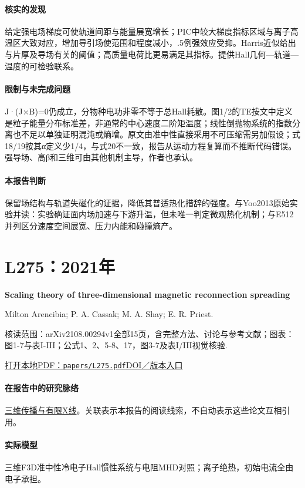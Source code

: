 \paragraph{核实的发现}给定强电场梯度可使轨道间距与能量展宽增长；PIC中较大梯度指标区域与离子高温区大致对应，增加导引场使范围和程度减小，.5例强效应受抑。Harris近似给出与片厚及导场有关的阈值；高质量电荷比更易满足其指标。提供Hall几何—轨道—温度的可检验联系。

\paragraph{限制与未完成问题}J·(J×B)=0仍成立，分物种电功非零不等于总Hall耗散。图1/2的TE按文中定义是粒子能量分布标准差，非通常的中心速度二阶矩温度；线性倒抛物系统的指数分离也不足以单独证明混沌或熵增。原文由准中性直接采用不可压缩需另加假设；式18/19按其α定义少1/4，与式20不一致，报告从运动方程复算而不推断代码错误。强导场、高β和三维可由其他机制主导，作者也承认。

\paragraph{本报告判断}保留场结构与轨道失磁化的证据，降低其普适热化措辞的强度。与Yoo2013原始实验并读：实验确证面内场加速与下游升温，但未唯一判定微观热化机制；与E512并列区分速度空间展宽、压力内能和碰撞熵产。

\section{L275：2021年}\label{paper:L275}

\textbf{Scaling theory of three-dimensional magnetic reconnection spreading}\citep{L275}\

Milton Arencibia;  P. A. Cassak;  M. A. Shay;  E. R. Priest.

\textsf{核读范围：}arXiv2108.00294v1全部15页，含完整方法、讨论与参考文献；\textsf{图表：}图1-7与表I-III；公式1、2、5-8、17，图3-7及表I/III视觉核验.

\href{run:papers/L275.pdf}{打开本地PDF：\texttt{papers/L275.pdf}}\quad\href{https://doi.org/10.1063/5.0052189}{DOI／版本入口}

\paragraph{在报告中的研究脉络}\hyperref[story:three]{三维传播与有限X线}。关联表示本报告的阅读线索，不自动表示这些论文互相引用。

\paragraph{实际模型}三维F3D准中性冷电子Hall惯性系统与电阻MHD对照；离子绝热，初始电流全由电子承担。

